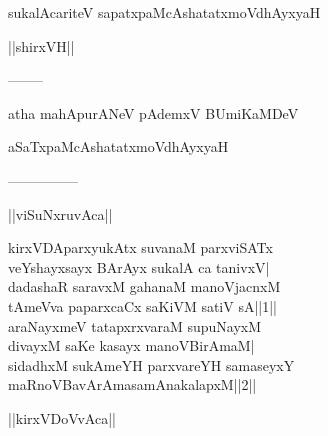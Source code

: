 \documentclass{article}
\begin{document}
\begin{center}
sukalAcariteV sapatxpaMcAshatatxmoVdhAyxyaH
\end{center}

\begin{center}
||shirxVH||
\end{center}

\begin{center}
--------
\end{center}

\begin{center}
atha mahApurANeV pAdemxV BUmiKaMDeV
\end{center}

\begin{center}
aSaTxpaMcAshatatxmoVdhAyxyaH
\end{center}

\begin{center}

---------------
\end{center}

\begin{center}
||viSuNxruvAca||
\end{center}

kirxVDAparxyukAtx suvanaM parxviSATx\\
veYshayxsayx BArAyx sukalA ca tanivxV|\\
dadashaR saravxM gahanaM manoVjacnxM\\
tAmeVva paparxcaCx saKiVM satiV sA||1||\\
araNayxmeV tatapxrxvaraM supuNayxM\\
divayxM saKe kasayx manoVBirAmaM|\\
sidadhxM sukAmeYH parxvareYH samaseyxY\\
maRnoVBavArAmasamAnakalapxM||2||\\

\begin{center}
||kirxVDoVvAca||
\end{center}
\end{document}
